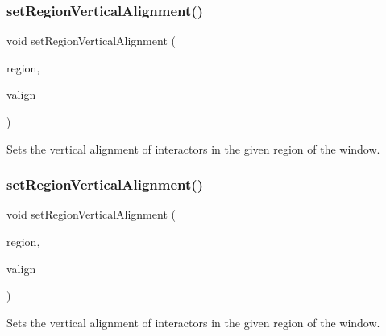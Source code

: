 \subsubsection{\texorpdfstring{set\+Region\+Vertical\+Alignment()}{setRegionVerticalAlignment()}\hspace{0.1cm}{\footnotesize\ttfamily [1/2]}}
{\footnotesize\ttfamily void set\+Region\+Vertical\+Alignment (\begin{DoxyParamCaption}\item[{const std\+::string \&}]{region,  }\item[{const std\+::string \&}]{valign }\end{DoxyParamCaption})\hspace{0.3cm}{\ttfamily [virtual]}}



Sets the vertical alignment of interactors in the given region of the window. 

\mbox{\label{classGWindow_a1efb2d3b67fb479aad27a6c0032ee70e}} 
\subsubsection{\texorpdfstring{set\+Region\+Vertical\+Alignment()}{setRegionVerticalAlignment()}\hspace{0.1cm}{\footnotesize\ttfamily [2/2]}}
{\footnotesize\ttfamily void set\+Region\+Vertical\+Alignment (\begin{DoxyParamCaption}\item[{\mbox{\hyperlink{classGWindow_a81a01a86de31071a92e6cce0bab9bc4b}{Region}}}]{region,  }\item[{Vertical\+Alignment}]{valign }\end{DoxyParamCaption})\hspace{0.3cm}{\ttfamily [virtual]}}



Sets the vertical alignment of interactors in the given region of the window. 

\mbox{\label{classGForwardDrawingSurface_aeff32a9d798f45677e84060eb9de68e9}} 

